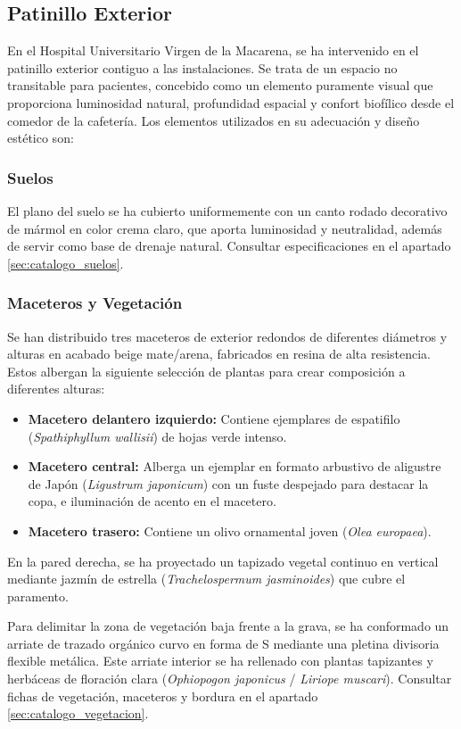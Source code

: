 \documentclass[12pt,a4paper]{article}
\begin{document}
\subsection{Patinillo Exterior }
En el Hospital Universitario Virgen de la Macarena, se ha intervenido en el patinillo exterior  contiguo a las instalaciones. Se trata de un espacio no transitable para pacientes, concebido como un elemento puramente visual que proporciona luminosidad natural, profundidad espacial y confort biofílico desde el comedor de la cafetería. Los elementos utilizados en su adecuación y diseño estético son:

\subsubsection{Suelos}
El plano del suelo se ha cubierto uniformemente con un canto rodado decorativo de mármol en color crema claro, que aporta luminosidad y neutralidad, además de servir como base de drenaje natural. Consultar especificaciones en el apartado \ref{sec:catalogo_suelos}.

\subsubsection{Maceteros y Vegetación}
Se han distribuido tres maceteros de exterior redondos de diferentes diámetros y alturas en acabado beige mate/arena, fabricados en resina de alta resistencia. Estos albergan la siguiente selección de plantas para crear composición a diferentes alturas:
\begin{itemize}
    \item \textbf{Macetero delantero izquierdo:} Contiene ejemplares de espatifilo (\textit{Spathiphyllum wallisii}) de hojas verde intenso.
    \item \textbf{Macetero central:} Alberga un ejemplar en formato arbustivo de aligustre de Japón (\textit{Ligustrum japonicum}) con un fuste despejado para destacar la copa, e iluminación de acento en el macetero.
    \item \textbf{Macetero trasero:} Contiene un olivo ornamental joven (\textit{Olea europaea}).
\end{itemize}
En la pared derecha, se ha proyectado un tapizado vegetal continuo en vertical mediante jazmín de estrella (\textit{Trachelospermum jasminoides}) que cubre el paramento. 

Para delimitar la zona de vegetación baja frente a la grava, se ha conformado un arriate de trazado orgánico curvo en forma de S mediante una pletina divisoria flexible metálica. Este arriate interior se ha rellenado con plantas tapizantes y herbáceas de floración clara (\textit{Ophiopogon japonicus} / \textit{Liriope muscari}). Consultar fichas de vegetación, maceteros y bordura en el apartado \ref{sec:catalogo_vegetacion}.
\end{document}
